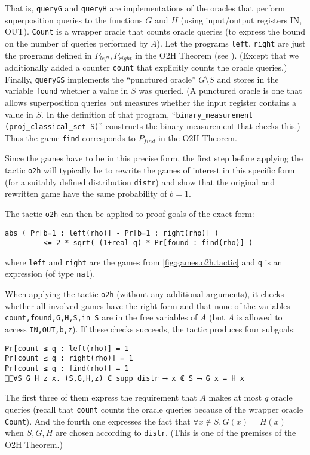 \documentclass{article}
\begin{document}
That is, \texttt{queryG} and \texttt{queryH} are implementations of
the oracles that perform superposition queries to the functions
$G$ and
$H$ (using input/output registers IN, OUT).  \texttt{Count} is a
wrapper oracle that counts oracle queries (to express the bound on the
number of queries performed by
$A$).  Let the programs \texttt{left}, \texttt{right} are just the
programs defined in $P_\mathit{left},
P_\mathit{right}$ in the O2H Theorem (see
\cite{ambainis19semiclassical}). (Except that we additionally added a
counter \texttt{count} that explicitly counts the oracle queries.)
Finally, \texttt{queryGS} implements the ``punctured oracle'' $G\setminus
S$ and stores in the variable \texttt{found} whether a value in
$S$ was queried. (A punctured oracle is one that
allows superposition queries but measures whether the input register contains
a value in $S$. In the definition of that program,
``\verb|binary_measurement (proj_classical_set S)|'' constructs the
binary measurement that checks this.) Thus the game \texttt{find} corresponds to
$P_\mathit{find}$ in the O2H Theorem.

Since the games have to be in this precise form, the first step before
applying the tactic \texttt{o2h} will typically be to rewrite the
games of interest in this specific form (for a suitably defined
distribution \texttt{distr}) and show that the original and rewritten
game have the same probability of $b=1$.

The tactic \texttt{o2h} can then be applied to proof goals of the exact form:
\begin{lstlisting}
abs ( Pr[b=1 : left(rho)] - Pr[b=1 : right(rho)] )
         <= 2 * sqrt( (1+real q) * Pr[found : find(rho)] )
\end{lstlisting}
where \texttt{left} and \texttt{right} are the games from \autoref{fig:games.o2h.tactic}
and \texttt{q} is an expression (of type \texttt{nat}).  

When applying the tactic \texttt{o2h} (without any additional
arguments), it checks whether all involved games have the right form
and that none of the variables \verb|count,found,G,H,S,in_S| are in
the free variables of $A$ (but $A$ is allowed to access
\texttt{IN,OUT,b,z}). If these checks succeeds, the tactic produces
four subgoals:
{\lstset{language=qrhl}%
\begin{lstlisting}
Pr[count ≤ q : left(rho)] = 1
Pr[count ≤ q : right(rho)] = 1
Pr[count ≤ q : find(rho)] = 1
∀S G H z x. (S,G,H,z) ∈ supp distr ⟶ x ∉ S ⟶ G x = H x
\end{lstlisting}}
The first three of them express the requirement that $A$ makes at most
$q$ oracle queries (recall that \texttt{count} counts the oracle
queries because of the wrapper oracle \texttt{Count}).  And the fourth
one expresses the fact that $\forall x\notin S, G(x)=H(x)$ when $S,G,H$ are chosen
according to \texttt{distr}. (This is one of the premises of the O2H
Theorem.)
\end{document}
